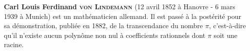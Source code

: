 \begin{His}
\textbf{Carl Louis Ferdinand \textsc{von Lindemann}} (12 avril 1852 à Hanovre - 6 mars 1939 à Munich) est un mathématicien allemand. Il est passé à la postérité pour sa démonstration, publiée en 1882, de la transcendance du nombre $\pi$, c'est-à-dire qu'il n'existe aucun polynôme non nul à coefficients rationnels dont $\pi$ soit une racine.



\end{His}





